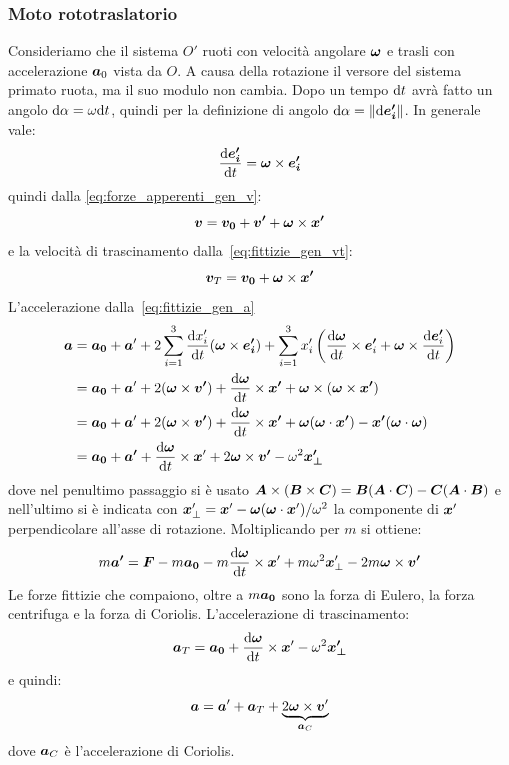 \subsubsection{Moto rototraslatorio}
Consideriamo che il sistema $O'$ ruoti con velocità angolare $\boldsymbol{\omega}$ e trasli con accelerazione $\boldsymbol{a}_0$ vista da $O$. A causa della rotazione il versore del sistema primato ruota, ma il suo modulo non cambia. Dopo un tempo $\mathrm{d} t$ avrà fatto un angolo $\mathrm{d}\alpha=\omega\mathrm{d} t$, quindi per la definizione di angolo $\mathrm{d}\alpha=\left\lVert\mathrm{d}\boldsymbol{e'_i}\right\rVert$. In generale vale:
\[
  \frac{\mathrm{d}\boldsymbol{e'_i}}{\mathrm{d} t}=\boldsymbol{\omega}\times\boldsymbol{e'_i}
\]
quindi dalla \eqref{eq:forze_apperenti_gen_v}:
\begin{equation}
  \boldsymbol{v}=\boldsymbol{v_0}+\boldsymbol{v'}+\boldsymbol{\omega}\times\boldsymbol{x'}
  \label{eq:forze_apparenti_rot_v}
\end{equation}
e la velocità di trascinamento dalla~\eqref{eq:fittizie_gen_vt}:
\[
  \boldsymbol{v}_T = \boldsymbol{v_0}+\boldsymbol{\omega}\times\boldsymbol{x'}
\]
L'accelerazione dalla~\eqref{eq:fittizie_gen_a}
\[
  \begin{split}
    \boldsymbol{a} &= \boldsymbol{a_0} + \boldsymbol{a}'
    +2\sum_{i=1}^3 \frac{\mathrm{d} x'_i}{\mathrm{d} t}(\boldsymbol{\omega}\times\boldsymbol{e'_i})+ \sum_{i=1}^3 x'_i\left(\frac{\mathrm{d}\boldsymbol{\omega}}{\mathrm{d} t}\times \boldsymbol{e'}_i + \boldsymbol{\omega}\times\frac{\mathrm{d}\boldsymbol{e'}_i}{\mathrm{d} t}\right) \\
    &= \boldsymbol{a_0} + \boldsymbol{a}'
    +2(\boldsymbol{\omega}\times\boldsymbol{v'})+ \frac{\mathrm{d}\boldsymbol{\omega}}{\mathrm{d} t}\times \boldsymbol{x'} + \boldsymbol{\omega}\times(\boldsymbol{\omega}\times \boldsymbol{x'}) \\
    &= \boldsymbol{a_0} + \boldsymbol{a}'
    +2(\boldsymbol{\omega}\times\boldsymbol{v'})+ \frac{\mathrm{d}\boldsymbol{\omega}}{\mathrm{d} t}\times \boldsymbol{x'} + \boldsymbol{\omega}(\boldsymbol{\omega}\cdot\boldsymbol{x'})-\boldsymbol{x'}(\boldsymbol{\omega}\cdot\boldsymbol{\omega}) \\
    & =\boldsymbol{a_0}+\boldsymbol{a'}+\frac{\mathrm{d}\boldsymbol{\omega}}{\mathrm{d} t}\times\boldsymbol{x}'+2\boldsymbol{\omega}\times\boldsymbol{v'}-\omega^2\boldsymbol{x'_\perp}
  \end{split}
\]
dove nel penultimo passaggio si è usato $\boldsymbol{A}\times(\boldsymbol{B}\times \boldsymbol{C})=\boldsymbol{B}(\boldsymbol{A}\cdot\boldsymbol{C})-\boldsymbol{C}(\boldsymbol{A}\cdot\boldsymbol{B})$ e nell'ultimo si è indicata con $\boldsymbol{x}'_\perp=\boldsymbol{x}'-\boldsymbol{\omega}(\boldsymbol{\omega}\cdot\boldsymbol{x}')/\omega^2$ la componente di $\boldsymbol{x}'$ perpendicolare all'asse di rotazione. Moltiplicando per $m$ si ottiene:
\begin{equation}
  \label{eq:newton_non_inerziale}
  m\boldsymbol{a'}=\boldsymbol{F}-m\boldsymbol{a_0}-m\frac{\mathrm{d}\boldsymbol{\omega}}{\mathrm{d} t}\times\boldsymbol{x}'+m\omega^2\boldsymbol{x}'_\perp-2m\boldsymbol{\omega}\times\boldsymbol{v'}
\end{equation}
Le forze fittizie che compaiono, oltre a $m\boldsymbol{a_0}$ sono la forza di Eulero, la forza centrifuga e la forza di Coriolis.
L'accelerazione di trascinamento:
\[
  \boldsymbol{a}_T = \boldsymbol{a_0}+\frac{\mathrm{d}\boldsymbol{\omega}}{\mathrm{d} t}\times\boldsymbol{x}'-\omega^2\boldsymbol{x'_\perp}
\]
e quindi:
\[
  \boldsymbol{a} = \boldsymbol{a}'+\boldsymbol{a}_T + \underbrace{2\boldsymbol{\omega}\times\boldsymbol{v}'}_{\boldsymbol{a}_C}
\]
dove $\boldsymbol{a}_C$ è l'accelerazione di Coriolis.
